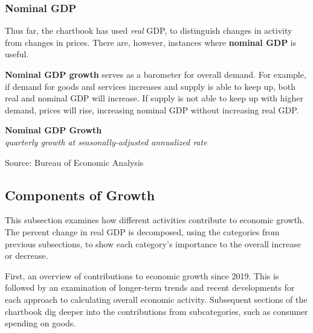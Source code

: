 \documentclass{report}
\makeatletter
\newcommand{\tbllink}[1]{\href{https://raw.githubusercontent.com/bdecon/US-chartbook/master/chartbook/data/#1}{\faTable}}
\newcommand*\short[1]{\expandafter\@gobbletwo\number\numexpr#1\relax}
\newcommand{\sbar}[4]{
		\addplot[ybar stacked, bar width=2.3pt, draw opacity=0, fill=#1] 
			table [x=#2, y=#3, col sep=comma]{#4};}
\newcommand{\dateaxisticks}{
		date coordinates in=x, axis line style={draw=none},
		xmax={2024-01-31},
		max space between ticks=40,	    
		xtick={{1990-01-01}, {1992-01-01}, {1994-01-01}, 
			{1996-01-01}, {1998-01-01}, {2000-01-01}, 
			{2002-01-01}, {2004-01-01}, {2006-01-01},
			{2008-01-01}, {2010-01-01}, {2012-01-01}, {2014-01-01},
		    {2016-01-01}, {2018-01-01}, {2020-01-01}, {2022-01-01}, 
		    {2024-01-01}, {2026-01-01}},
		minor xtick={{1989-01-01}, {1991-01-01}, {1993-01-01},
			{1995-01-01}, {1997-01-01}, {1999-01-01}, 
			{2001-01-01}, {2003-01-01}, {2005-01-01}, {2007-01-01},
		    {2009-01-01}, {2011-01-01}, {2013-01-01}, {2015-01-01},
		    {2017-01-01}, {2019-01-01}, {2021-01-01}, {2023-01-01}, 
		    {2025-01-01}, {2027-01-01}},
		enlarge y limits={0.06}, enlarge x limits={0.01},
		xticklabel style={align=center, yshift=-2pt}, tick label style={inner sep=0pt},
		}
\newcommand{\bbar}[2]{extra #1 ticks = {{#2}}, extra #1 tick labels = ,
		extra #1 tick style = {grid=major, grid style={thick, black!25}},}
\newcommand{\rbars}{
		\fill[color=black!10] (axis cs:{1990-07-01},\pgfkeysvalueof{/pgfplots/ymin})
			rectangle (axis cs:{1991-03-01}, \pgfkeysvalueof{/pgfplots/ymax});
		\fill[color=black!10] (axis cs:{2007-12-01},\pgfkeysvalueof{/pgfplots/ymin})
			rectangle (axis cs:{2009-07-01}, \pgfkeysvalueof{/pgfplots/ymax});
		\fill[color=black!10] (axis cs:{2001-03-01},\pgfkeysvalueof{/pgfplots/ymin})
			rectangle (axis cs:{2001-11-01}, \pgfkeysvalueof{/pgfplots/ymax});
		\fill[color=black!10] (axis cs:{2020-02-01},\pgfkeysvalueof{/pgfplots/ymin})
			rectangle (axis cs:{2020-05-01}, \pgfkeysvalueof{/pgfplots/ymax});}
\makeatother
\begin{document}
\newpage
\vspace*{-12mm}
 

\begin{minipage}{1.0\textwidth} 
\subsubsection*{Nominal GDP}
\small Thus far, the chartbook has used \textit{real} GDP, to distinguish changes in activity from changes in prices. There are, however, instances where \textbf{nominal GDP} is useful. 

\textbf{Nominal GDP growth} serves as a barometer for overall demand. For example, if demand for goods and services increases and supply is able to keep up, both real and nominal GDP will increase. If supply is not able to keep up with higher demand, prices will rise, increasing nominal GDP without increasing real GDP.


\vspace{1mm}

\normalsize \textbf{Nominal GDP Growth}\\
\footnotesize{\textit{quarterly growth at seasonally-adjusted annualized rate}}
\vspace{3.15cm}

\hspace{3mm} 
\vspace{-1mm}

\footnotesize{Source: Bureau of Economic Analysis} \hfill \tbllink{ngdp_gr.csv}
\vspace{1mm}

\hypertarget{oegc}{\label{oegc}}   
\subsection*{Components of Growth}
\small This subsection examines how different activities contribute to economic growth. The percent change in real GDP is decomposed, using the categories from previous subsections, to show each category's importance to the overall increase or decrease. 

First, an overview of contributions to economic growth since 2019. This is followed by an examination of longer-term trends and recent developments for each approach to calculating overall economic activity. Subsequent sections of the chartbook dig deeper into the contributions from subcategories, such as consumer spending on goods. 
\end{minipage}
\end{document}
